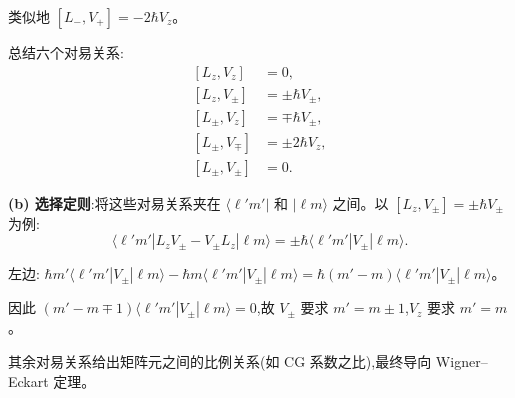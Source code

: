 \begin{question}
\begin{solution}
	类似地 $[L_-,V_+] = -2\hbar V_z$。

	总结六个对易关系:
	\[
	\boxed{
	\begin{aligned}
	[L_z,V_z] &= 0, \\
	[L_z,V_\pm] &= \pm\hbar V_\pm, \\
	[L_\pm,V_z] &= \mp\hbar V_\pm, \\
	[L_\pm,V_\mp] &= \pm 2\hbar V_z, \\
	[L_\pm,V_\pm] &= 0.
	\end{aligned}}
	\]

	\textbf{(b) 选择定则}:将这些对易关系夹在 $\langle\ell'm'|$ 和 $|\ell m\rangle$ 之间。以 $[L_z,V_\pm]=\pm\hbar V_\pm$ 为例:
	\[
	\langle\ell'm'|L_zV_\pm - V_\pm L_z|\ell m\rangle = \pm\hbar\langle\ell'm'|V_\pm|\ell m\rangle.
	\]

	左边:
	$\hbar m'\langle\ell'm'|V_\pm|\ell m\rangle - \hbar m\langle\ell'm'|V_\pm|\ell m\rangle = \hbar(m'-m)\langle\ell'm'|V_\pm|\ell m\rangle$。

	因此 $(m'-m\mp1)\langle\ell'm'|V_\pm|\ell m\rangle=0$,故 $V_\pm$ 要求 $m'=m\pm1$,$V_z$ 要求 $m'=m$。

	其余对易关系给出矩阵元之间的比例关系(如 CG 系数之比),最终导向 Wigner--Eckart 定理。
	\end{solution}
\end{question}

